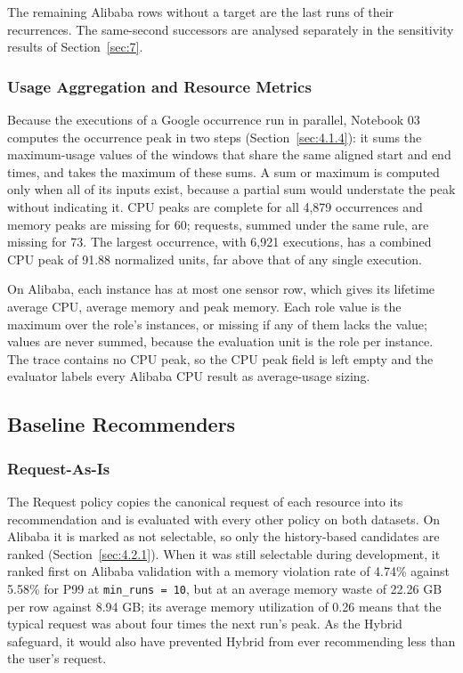 \documentclass{IEEEtran}
\begin{document}
The remaining Alibaba rows without a target are the last runs of their recurrences. The same-second successors are analysed separately in the sensitivity results of Section~\ref{sec:7}.

\subsubsection{Usage Aggregation and Resource Metrics}\label{sec:5.1.3}

Because the executions of a Google occurrence run in parallel, Notebook 03 computes the occurrence peak in two steps (Section~\ref{sec:4.1.4}): it sums the maximum-usage values of the windows that share the same aligned start and end times, and takes the maximum of these sums. A sum or maximum is computed only when all of its inputs exist, because a partial sum would understate the peak without indicating it. CPU peaks are complete for all 4,879 occurrences and memory peaks are missing for 60; requests, summed under the same rule, are missing for 73. The largest occurrence, with 6,921 executions, has a combined CPU peak of 91.88 normalized units, far above that of any single execution.

On Alibaba, each instance has at most one sensor row, which gives its lifetime average CPU, average memory and peak memory. Each role value is the maximum over the role's instances, or missing if any of them lacks the value; values are never summed, because the evaluation unit is the role per instance. The trace contains no CPU peak, so the CPU peak field is left empty and the evaluator labels every Alibaba CPU result as average-usage sizing.

\subsection{Baseline Recommenders}\label{sec:5.2}

\subsubsection{Request-As-Is}\label{sec:5.2.1}

The Request policy copies the canonical request of each resource into its recommendation and is evaluated with every other policy on both datasets. On Alibaba it is marked as not selectable, so only the history-based candidates are ranked (Section~\ref{sec:4.2.1}). When it was still selectable during development, it ranked first on Alibaba validation with a memory violation rate of 4.74\% against 5.58\% for P99 at \texttt{min\_runs\ =\ 10}, but at an average memory waste of 22.26 GB per row against 8.94 GB; its average memory utilization of 0.26 means that the typical request was about four times the next run's peak. As the Hybrid safeguard, it would also have prevented Hybrid from ever recommending less than the user's request.
\end{document}
